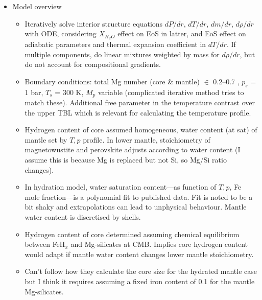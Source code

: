 \documentclass{article}
\begin{document}
\begin{itemize}
\item Model overview
\begin{itemize}
\item  Iteratively solve interior structure equations $dP/dr$, $dT/dr$, $dm/dr$, $d\rho/dr$ with ODE, considering $X_{H_2O}$ effect on EoS in latter, and EoS effect on adiabatic parameters and thermal expansion coefficient in $dT/dr$. If multiple components, do linear mixtures weighted by mass for $d\rho/dr$, but do not account for compositional gradients.
\item Boundary conditions: total Mg number (core \& mantle) $\in$ 0.2--0.7 \citep[sample]{grassetStudyAccuracyMassRadius2009}, $p_s$ = 1 bar, $T_s$ = 300 K, $M_p$ variable (complicated iterative method tries to match these). Additional free parameter in the temperature contrast over the upper TBL which is relevant for calculating the temperature profile.
\item Hydrogen content of core assumed homogeneous, water content (at sat) of mantle set by $T, p$ profile. In lower mantle, stoichiometry of magnetowustite and perovskite adjusts according to water content (I assume this is because Mg is replaced but not Si, so Mg/Si ratio changes).
\item In hydration model, water saturation content---as function of $T, p$, Fe mole fraction---is a polynomial fit to published data. Fit is noted to be a bit shaky and extrapolations can lead to unphysical behaviour. Mantle water content is discretised by shells.
\item Hydrogen content of core determined assuming chemical equilibrium between FeH$_x$ and Mg-silicates at CMB. Implies core hydrogen content would adapt if mantle water content changes lower mantle stoichiometry.
\item Can't follow how they calculate the core size for the hydrated mantle case but I think it requires assuming a fixed iron content of 0.1 for the mantle Mg-silicates.
\end{itemize}


\end{itemize}
\end{document}
